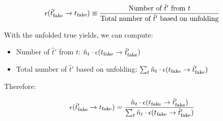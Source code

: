 \begin{equation}
    \misEff[\hat{t}_\text{fake}']{t_\text{fake}} \equiv
        \frac{
            \text{Number of $\hat{t}'$ from $t$}
        }{
            \text{Total number of $\hat{t}'$ based on unfolding}
        }
\end{equation}

With the unfolded true yields, we can compute:

\begin{itemize}
    \item Number of $\hat{t}'$ from $t$:
        $\tilde{n}_t \cdot \misEff[t_\text{fake}]{\hat{t}_\text{fake}'}$
    \item Total number of $\hat{t}'$ based on unfolding:
        $\sum_t \tilde{n}_t \cdot \misEff[t_\text{fake}]{\hat{t}_\text{fake}'}$
\end{itemize}

Therefore:

\begin{equation}
    \misEff[\hat{t}_\text{fake}']{t_\text{fake}} =
        \frac{
            \tilde{n}_t \cdot \misEff[t_\text{fake}]{\hat{t}_\text{fake}'}
        }{
            \sum_t \tilde{n}_t \cdot \misEff[t_\text{fake}]{\hat{t}_\text{fake}'}
        }
\end{equation}
